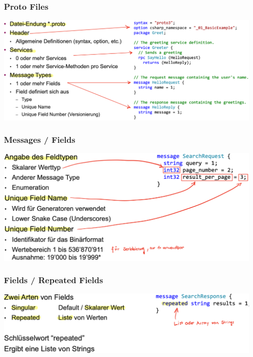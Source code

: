 \subsubsection{Proto Files}
\begin{center}
    \includegraphics[scale=.35]{graphic/gprc/Proto Files.png}
\end{center}
\vspace{-8pt}

\subsubsection{Messages / Fields}
\begin{center}
    \includegraphics[scale=.35]{graphic/gprc/Messages Fields.png}
\end{center}
\vspace{-8pt}

\subsubsection{Fields / Repeated Fields}
\begin{center}
    \includegraphics[scale=.35]{graphic/gprc/Fields Repeated Fields.png}
\end{center}
\vspace{-8pt}

